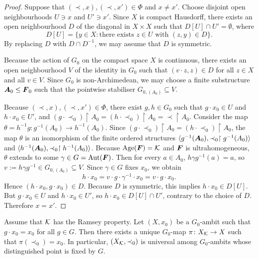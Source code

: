 \begin{proof}
    Suppose that \((\prec,x),(\prec,x')\in \Phi\) and \(x\neq x'\).
    Choose disjoint open neighbourhoods \(U\ni x\) and \(U'\ni x'\).
    Since \(X\) is compact Hausdorff, there exists an open neighbourhood \(D\) of the diagonal in \(X\times X\) such that
    \(D[U]\cap U'=\emptyset\), where
    \[
        D[U]=\{y\in X \mathrel{:} \text{there exists } z\in U \text{ with } (z,y)\in D\}.
    \]
    By replacing \(D\) with \(D\cap D^{-1}\),
    we may assume that \(D\) is symmetric.

    Because the action of \(G_0\) on the compact space \(X\) is continuous, there exists an open neighbourhood \(V\) of the identity in \(G_0\) such that
    \((v\cdot z,z)\in D\) for all \(z\in X\) and all \(v\in V\).
    Since \(G_0\) is non-Archimedean, we may choose a finite substructure
    \(\boldsymbol{A}_0\leq \boldsymbol{F}_0\)
    such that the pointwise stabiliser
    \(G_{0,(A_0)}\subseteq V\).

    Because \((\prec,x),(\prec,x')\in \Phi\),
    there exist
    \(g,h\in G_0\)
    such that
    \(g\cdot x_0\in U\) and \(h\cdot x_0\in U'\),
    and
    \((g\cdot \prec_0)\restriction A_0=(h\cdot \prec_0)\restriction A_0=\prec\restriction A_0\).
    Consider the map
    \(\theta=h^{-1}g\colon g^{-1}(A_0)\to h^{-1}(A_0)\).
    Since
    \((g\cdot \prec_0)\restriction A_0=(h\cdot \prec_0)\restriction A_0\),
    the map \(\theta\) is an isomorphism of the finite ordered structures
    \(\langle g^{-1}(\boldsymbol{A}_0),\prec_0\restriction g^{-1}(A_0)\rangle\) and
    \(\langle h^{-1}(\boldsymbol{A}_0),\prec_0\restriction h^{-1}(A_0)\rangle\).
    Because \(\operatorname{Age}(\boldsymbol{F})=\mathcal{K}\)
    and \(\boldsymbol{F}\) is ultrahomogeneous, \(\theta\) extends to some
    \(\gamma\in G=\operatorname{Aut}(\boldsymbol{F})\).
    Then for every \(a\in A_0\),
    \(h\gamma g^{-1}(a)=a\),
    so
    \(v:=h\gamma g^{-1}\in G_{0,(A_0)}\subseteq V\).
    Since \(\gamma\in G\) fixes \(x_0\), we obtain
    \[
        h\cdot x_0=v\cdot g\cdot \gamma^{-1}\cdot x_0=v\cdot g\cdot x_0.
    \]
    Hence
    \((h\cdot x_0,g\cdot x_0)\in D\).
    Because \(D\) is symmetric, this implies
    \(h\cdot x_0\in D[U]\).
    But
    \(g\cdot x_0\in U\) and \(h\cdot x_0\in U'\),
    so
    \(h\cdot x_0\in D[U]\cap U'\),
    contrary to the choice of \(D\). Therefore
    \(x=x'\).
\end{proof}
\begin{theorem}
    \label{thm:ramsey-universal-ambit}
    Assume that \(\mathcal{K}\) has the Ramsey property. Let \((X,x_0)\) be a \(G_0\)-ambit
    such that \(g\cdot x_0=x_0\) for all \(g\in G\).
    Then there exists a unique \(G_0\)-map \(\pi\colon X_{\mathcal{K}}\to X\) such that
    \(\pi(\prec_0)=x_0\).
    In particular, \((X_{\mathcal{K}},\prec_0)\) is universal among \(G_0\)-ambits whose distinguished point is fixed by \(G\).
\end{theorem}


